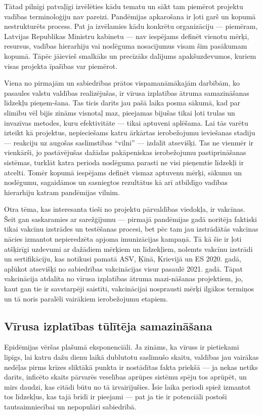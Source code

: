 \documentclass[12pt, a4paper]{article}
\numberwithin{equation}{section} %
\begin{document}
Tātad pilnīgi patvaļīgi izvēlēties kādu tematu un sākt tam piemērot projektu vadības terminoloģiju nav pareizi. Pandēmijas apkarošana ir ļoti garš un kopumā nestrukturēts process. Pat ja izvēlamies kādu konkrētu organizāciju --- piemēram, Latvijas Republikas Ministru kabinetu --- nav iespējams definēt vienotu mērķi, resursus, vadības hierarhiju vai noslēguma nosacījumus visam šim pasākumam kopumā. Tāpēc jāievieš smalkāks un precīzāks dalījums apakšuzdevumos, kuriem visas projekta īpašības var piemērot.

Viena no pirmajām un sabiedrības prātos vispamanāmākajām darbībām, ko pasaules valstu valdības realizējušas, ir vīrusa izplatības ātruma samazināšanas līdzekļu pieņem-šana. Tas ticis darīts jau pašā laika posma sākumā, kad par slimību vēl bijis zināms visnotaļ maz, pieejamas bijušas tikai ļoti trulas un invazīvas metodes, kuru efektivitāte --- tikai aptuveni aplēšama. Lai tās varētu izteikt kā projektus, nepieciešams katru ārkārtas ierobežojumu ieviešanas stadiju --- reakciju uz augošas saslimstības ``vilni'' --- izdalīt atsevišķi. Tas ne vienmēr ir vienkārši, jo pastāvējušas dažādas pakāpeniskas ierobežojumu pastiprināšanas sistēmas, turklāt katra perioda noslēguma parasti ne visi pieņemtie līdzekļi ir atcelti. Tomēr kopumā iespējams definēt vismaz aptuvenu mērķi, sākumu un noslēgumu, sagaidāmos un sasniegtos rezultātus kā arī atbildīgo vadības hierarhiju katram pandēmijas vilnim.

Otra tēma, kas interesanta tieši no projektu pārvaldības viedokļa, ir vakcīnas. Šeit gan saskaramies ar sarežģījumu --- pirmajā pandēmijas gadā noritēja faktiski tikai vakcīnu izstrādes un testēšanas procesi, bet pēc tam jau izstrādātās vakcīnas nācies izmantot nepieredzēta apjoma imunizācijas kampaņā. Tā kā šie ir ļoti atšķirīgi uzdevumi ar dažādiem mērķiem un līdzekļiem, nolemts vakcīnu izstrādi un sertifikāciju, kas notikusi pamatā ASV, Ķīnā, Krievijā un ES 2020. gadā, aplūkot atsevišķi no sabiedrības vakcinācijas visur pasaulē 2021. gadā. Tāpat vakcinācija atdalīta no vīrusa izplatības ātruma mazi-nāšanas projektiem, jo, kaut gan tie ir savstarpēji saistīti, vakcinācijai nosprausti mērķi ilgākos termiņos un tā noris paralēli vairākiem ierobežojumu etapiem.

\subsection{Vīrusa izplatības tūlītēja samazināšana}

Epidēmijas vēršas plašumā eksponenciāli. Ja zināms, ka vīruss ir pietiekami lipīgs, lai katru dažu dienu laikā dublutotu saslimušo skaitu, valdības jau vairākas nedēļas pirms krīzes sliktākā punkta ir nostādītas fakta priekšā --- ja nekas netiks darīts, inficēto skaits pārvarēs veselības aprūpes sistēmu spēju tos aprūpēt, un mirs daudzi, kas citādi būtu no tā izvairījušies. Īsie laika periodi spiež izmantot tos līdzekļus, kas tajā brīdī ir pieejami --- pat ja tie ir potenciāli postoši tautsaimniecībai un nepopulāri sabiedrībā.
\end{document}
